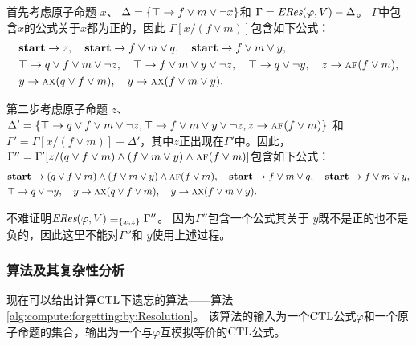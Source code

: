 \begin{example}\label{examp:Aclm}
	首先考虑原子命题 $x$、 $\Delta=\{\top \rightarrow f \vee m \vee \neg x\}$和 $\Gamma=\emph{ERes}(\varphi,V)-\Delta$。
	$\Gamma$中包含$x$的公式关于$x$都为正的，因此 $\Gamma[x/(f \vee m)]$包含如下公式：
	\begin{align*}%
		& \start\rto z, \quad \start \rto f\vee m \vee q, \quad  \start \rto f \vee m \vee y, \\
		& \top \rto q \vee f \vee m \vee \neg z, \quad 	\top \rto f \vee m \vee y \vee \neg z,
		\quad \top \rto q\vee\neg y , \quad z \rto \ALL \FUTURE (f \vee m), \\
		& y \rto \ALL\NEXT(q \vee f\vee m), %
		\quad 	y \rto \ALL\NEXT(f\vee m\vee y).
	\end{align*}
	
	第二步考虑原子命题 $z$、
	$\Delta'=\{ \top \rightarrow q \vee f \vee m \vee \neg z, \top \rightarrow f \vee m \vee y \vee \neg z ,z \rightarrow \textsc{a} \textsc{f} (f \vee m)\}$
	和 $\Gamma'=\Gamma[x/(f \vee m)] -\Delta'$，其中$z$正出现在$\Gamma'$中。因此，
	$\Gamma''=\Gamma'[z/ (q \vee f \vee m)\land (f \vee m \vee y)\land\textsc{a} \textsc{f} (f \vee m)]$包含如下公式：
	\begin{align*}%
		& \start\rto  (q \vee f \vee m)\land (f \vee m \vee y)\land\ALL \FUTURE (f \vee m),
		\quad \start \rto f\vee m \vee q, \quad  \start \rto f \vee m \vee y,  \\
		&  \top \rto q\vee\neg y,  \quad y \rto \ALL\NEXT(q \vee f\vee m), \quad y \rto \ALL\NEXT(f\vee m\vee y).
	\end{align*}
	
	不难证明$\emph{ERes}(\varphi,V)\equiv_{\{x,z\}} \Gamma''$。
	因为$\Gamma''$包含一个公式其关于 $y$既不是正的也不是负的，因此这里不能对$\Gamma''$和 $y$使用上述过程。 
\end{example}


\subsubsection{算法及其复杂性分析}
\label{cha4:sec:alg}
现在可以给出计算$\textrm{CTL}$下遗忘的算法——算法\ref{alg:compute:forgetting:by:Resolution}。
该算法的输入为一个$\textrm{CTL}$公式$\varphi$和一个原子命题的集合，输出为一个与$\varphi$互模拟等价的$\textrm{CTL}$公式。
%


